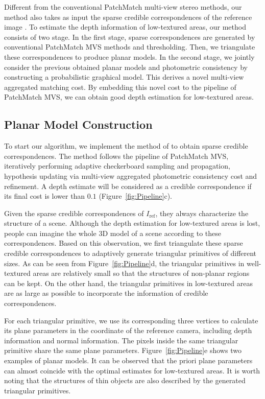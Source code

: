 \documentclass[letterpaper]{article} %
\begin{document}
Different from the conventional PatchMatch multi-view stereo methods, our method also takes as input the sparse credible correspondences of the reference image . To estimate the depth information of low-textured areas, our method consists of two stage. In the first stage, sparse correspondences are generated by conventional PatchMatch MVS methods and thresholding. Then, we triangulate these correspondences to produce planar models. In the second stage, we jointly consider the previous obtained planar models and photometric consistency by constructing a probabilistic graphical model. This derives a novel multi-view aggregated matching cost. By embedding this novel cost to the pipeline of PatchMatch MVS, we can obtain good depth estimation for low-textured areas.  

\subsection{Planar Model Construction} 

To start our algorithm, we implement the method of \cite{Xu2018Multi} to obtain sparse credible correspondences. The method follows the pipeline of PatchMatch MVS, iteratively performing adaptive checkerboard sampling and propagation, hypothesis updating via multi-view aggregated photometric consistency cost and refinement. A depth estimate will be considered as a credible correspondence if its final cost is lower than $0.1$ (Figure~\ref{fig:Pipeline}c).  

Given the sparse credible correspondences of $I_{\text{ref}}$, they always characterize the structure of a scene. Although the depth estimation for low-textured areas is lost, people can imagine the whole 3D model of a scene according to these correspondences. Based on this observation, we first triangulate these sparse credible correspondences to adaptively generate triangular primitives of different sizes. As can be seen from Figure~\ref{fig:Pipeline}d, the triangular primitives in well-textured areas are relatively small so that the structures of non-planar regions can be kept. On the other hand, the triangular primitives in low-textured areas are as large as possible to incorporate the information of credible correspondences.  

For each triangular primitive, we use its corresponding three vertices to calculate its plane parameters in the coordinate of the reference camera, including depth information and normal information. The pixels inside the same triangular primitive share the same plane parameters. Figure~\ref{fig:Pipeline}e shows two examples of planar models. It can be observed that the priori plane parameters can almost coincide with the optimal estimates for low-textured areas. It is worth noting that the structures of thin objects are also described by the generated triangular primitives. 
\end{document}
